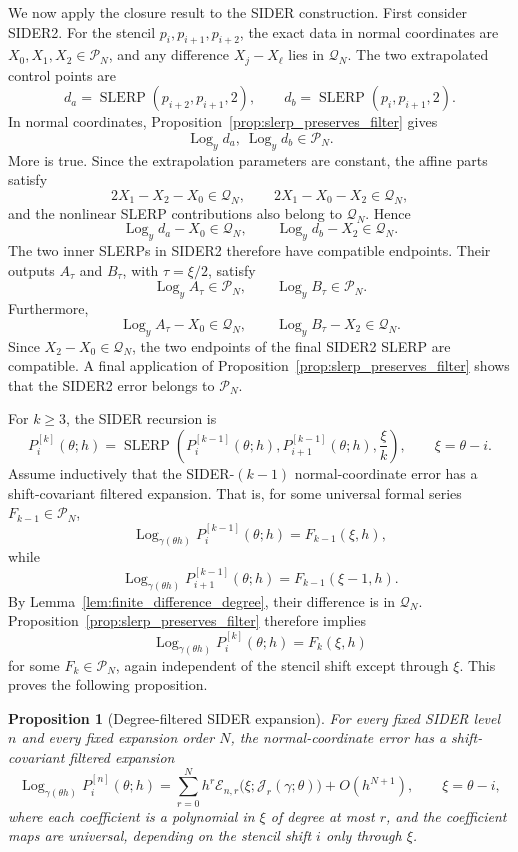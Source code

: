 \documentclass[a4paper,11pt]{article}
\newcommand{\Log}{\operatorname{Log}}
\newcommand{\SLERP}{\operatorname{SLERP}}
\newtheorem{prop}{Proposition}
\numberwithin{equation}{section}
\begin{document}
We now apply the closure result to the SIDER construction.  First consider
SIDER2.  For the stencil \(p_i,p_{i+1},p_{i+2}\), the exact data in normal
coordinates are \(X_0,X_1,X_2\in\mathcal P_N\), and any difference
\(X_j-X_\ell\) lies in \(\mathcal Q_N\).  The two extrapolated control points
are
\[
        d_a=\SLERP(p_{i+2},p_{i+1},2),
        \qquad
        d_b=\SLERP(p_i,p_{i+1},2).
\]
In normal coordinates, Proposition~\ref{prop:slerp_preserves_filter} gives
\[
        \Log_y d_a,\ \Log_y d_b\in\mathcal P_N .
\]
More is true.  Since the extrapolation parameters are constant, the affine
parts satisfy
\[
        2X_1-X_2-X_0\in\mathcal Q_N,
        \qquad
        2X_1-X_0-X_2\in\mathcal Q_N,
\]
and the nonlinear SLERP contributions also belong to \(\mathcal Q_N\).  Hence
\[
        \Log_y d_a-X_0\in\mathcal Q_N,
        \qquad
        \Log_y d_b-X_2\in\mathcal Q_N .
\]
The two inner SLERPs in SIDER2 therefore have compatible endpoints.  Their
outputs \(A_\tau\) and \(B_\tau\), with \(\tau=\xi/2\), satisfy
\[
        \Log_y A_\tau\in\mathcal P_N,\qquad
        \Log_y B_\tau\in\mathcal P_N.
\]
Furthermore,
\[
        \Log_y A_\tau-X_0\in\mathcal Q_N,
        \qquad
        \Log_y B_\tau-X_2\in\mathcal Q_N.
\]
Since \(X_2-X_0\in\mathcal Q_N\), the two endpoints of the final SIDER2 SLERP
are compatible.  A final application of
Proposition~\ref{prop:slerp_preserves_filter} shows that the SIDER2 error
belongs to \(\mathcal P_N\).

For \(k\ge3\), the SIDER recursion is
\[
P_i^{[k]}(\theta;h)
=
\SLERP\!\left(
        P_i^{[k-1]}(\theta;h),
        P_{i+1}^{[k-1]}(\theta;h),
        \frac{\xi}{k}
       \right),
        \qquad \xi=\theta-i.
\]
Assume inductively that the SIDER-\((k-1)\) normal-coordinate error has a
shift-covariant filtered expansion.  That is, for some universal formal series
\(F_{k-1}\in\mathcal P_N\),
\[
        \Log_{\gamma(\theta h)}P_i^{[k-1]}(\theta;h)
        =
        F_{k-1}(\xi,h),
\]
while
\[
        \Log_{\gamma(\theta h)}P_{i+1}^{[k-1]}(\theta;h)
        =
        F_{k-1}(\xi-1,h).
\]
By Lemma~\ref{lem:finite_difference_degree}, their difference is in
\(\mathcal Q_N\).  Proposition~\ref{prop:slerp_preserves_filter} therefore
implies
\[
        \Log_{\gamma(\theta h)}P_i^{[k]}(\theta;h)
        =
        F_k(\xi,h)
\]
for some \(F_k\in\mathcal P_N\), again independent of the stencil shift except
through \(\xi\).  This proves the following proposition.

\begin{prop}[Degree-filtered SIDER expansion]
\label{prop:sider_degree_filtered}
For every fixed SIDER level \(n\) and every fixed expansion order \(N\), the
normal-coordinate error has a shift-covariant filtered expansion
\[
        \Log_{\gamma(\theta h)}P_i^{[n]}(\theta;h)
        =
        \sum_{r=0}^{N}h^r
        \mathcal E_{n,r}
        \bigl(\xi;\mathcal J_r(\gamma;\theta)\bigr)
        +
        O(h^{N+1}),
        \qquad \xi=\theta-i,
\]
where each coefficient is a polynomial in \(\xi\) of degree at most \(r\), and
the coefficient maps are universal, depending on the stencil shift \(i\) only
through \(\xi\).
\end{prop}
\end{document}
